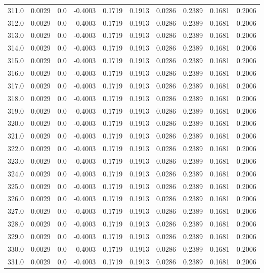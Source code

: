 \begin{longtable}{lrrrrrrrrr}
311.0 & 0.0029 & 0.0 & -0.4003 & 0.1719 & 0.1913 & 0.0286 & 0.2389 & 0.1681 & 0.2006 \\
312.0 & 0.0029 & 0.0 & -0.4003 & 0.1719 & 0.1913 & 0.0286 & 0.2389 & 0.1681 & 0.2006 \\
313.0 & 0.0029 & 0.0 & -0.4003 & 0.1719 & 0.1913 & 0.0286 & 0.2389 & 0.1681 & 0.2006 \\
314.0 & 0.0029 & 0.0 & -0.4003 & 0.1719 & 0.1913 & 0.0286 & 0.2389 & 0.1681 & 0.2006 \\
315.0 & 0.0029 & 0.0 & -0.4003 & 0.1719 & 0.1913 & 0.0286 & 0.2389 & 0.1681 & 0.2006 \\
316.0 & 0.0029 & 0.0 & -0.4003 & 0.1719 & 0.1913 & 0.0286 & 0.2389 & 0.1681 & 0.2006 \\
317.0 & 0.0029 & 0.0 & -0.4003 & 0.1719 & 0.1913 & 0.0286 & 0.2389 & 0.1681 & 0.2006 \\
318.0 & 0.0029 & 0.0 & -0.4003 & 0.1719 & 0.1913 & 0.0286 & 0.2389 & 0.1681 & 0.2006 \\
319.0 & 0.0029 & 0.0 & -0.4003 & 0.1719 & 0.1913 & 0.0286 & 0.2389 & 0.1681 & 0.2006 \\
320.0 & 0.0029 & 0.0 & -0.4003 & 0.1719 & 0.1913 & 0.0286 & 0.2389 & 0.1681 & 0.2006 \\
321.0 & 0.0029 & 0.0 & -0.4003 & 0.1719 & 0.1913 & 0.0286 & 0.2389 & 0.1681 & 0.2006 \\
322.0 & 0.0029 & 0.0 & -0.4003 & 0.1719 & 0.1913 & 0.0286 & 0.2389 & 0.1681 & 0.2006 \\
323.0 & 0.0029 & 0.0 & -0.4003 & 0.1719 & 0.1913 & 0.0286 & 0.2389 & 0.1681 & 0.2006 \\
324.0 & 0.0029 & 0.0 & -0.4003 & 0.1719 & 0.1913 & 0.0286 & 0.2389 & 0.1681 & 0.2006 \\
325.0 & 0.0029 & 0.0 & -0.4003 & 0.1719 & 0.1913 & 0.0286 & 0.2389 & 0.1681 & 0.2006 \\
326.0 & 0.0029 & 0.0 & -0.4003 & 0.1719 & 0.1913 & 0.0286 & 0.2389 & 0.1681 & 0.2006 \\
327.0 & 0.0029 & 0.0 & -0.4003 & 0.1719 & 0.1913 & 0.0286 & 0.2389 & 0.1681 & 0.2006 \\
328.0 & 0.0029 & 0.0 & -0.4003 & 0.1719 & 0.1913 & 0.0286 & 0.2389 & 0.1681 & 0.2006 \\
329.0 & 0.0029 & 0.0 & -0.4003 & 0.1719 & 0.1913 & 0.0286 & 0.2389 & 0.1681 & 0.2006 \\
330.0 & 0.0029 & 0.0 & -0.4003 & 0.1719 & 0.1913 & 0.0286 & 0.2389 & 0.1681 & 0.2006 \\
331.0 & 0.0029 & 0.0 & -0.4003 & 0.1719 & 0.1913 & 0.0286 & 0.2389 & 0.1681 & 0.2006 \\

\end{longtable}
